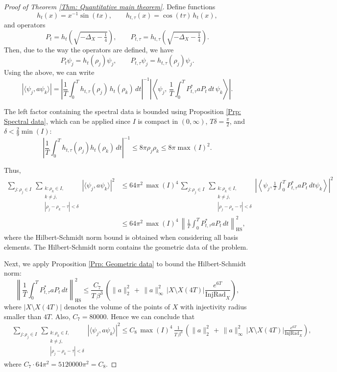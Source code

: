 \documentclass[11pt,twoside,reqno]{amsart} \usepackage{a4wide} \usepackage[T1]{fontenc} \usepackage[utf8]{inputenc} \usepackage{soul}  \usepackage{amsmath} \usepackage{amsfonts} \usepackage{amssymb} \usepackage{mathtools} \usepackage{amsthm} \usepackage{xcolor} \usepackage{graphicx} \usepackage{hyperref} \usepackage{standalone} \usepackage{esint} \usepackage{comment} \usepackage[left=2.3cm,top=3cm,right=2.3cm]{geometry} \usepackage{bm} \usepackage{svg} \usepackage{float} \numberwithin{equation}{section} \theoremstyle{plain} \newtheorem{thm}{Theorem}[section] \newtheorem{theorem}[thm]{Theorem} \newtheorem*{theorem*}{Theorem}\newtheorem{conj}[thm]{Conjecture} \newtheorem{lemma}[thm]{Lemma} \newtheorem{prop}[thm]{Proposition} \newtheorem{proposition}[thm]{Proposition} \newtheorem{cor}[thm]{Corollary} \newtheorem{question}[thm]{Question} \newtheorem{corollary}[thm]{Corollary} \newtheorem{assumption}[thm]{Assumption} \theoremstyle{definition} \newtheorem{defn}[thm]{Definition} \newtheorem{choice}[thm]{Choice} \newtheorem{definition}[thm]{Definition} \newtheorem{ex}[thm]{Example} \newtheorem{notation}[thm]{Notation} \newtheorem*{ack}{Acknowledgements} \theoremstyle{remark} \newtheorem{remark}[thm]{Remark} \newtheorem{bigremark}[thm]{Remark} \usepackage{xcolor} \newcommand{\red}[1]{ {\color{Red}#1} } \newcommand{\blue}[1]{ {\color{Blue}#1} } \author{Kai Hippi} \address{Aalto University, Espoo, Finland} \email{kai.hippi@aalto.fi}
\begin{document}
\begin{proof}[Proof of Theorem \ref{Thm: Quantitative main theorem}]
Define functions
\[
h_t(x) = x^{-1}\sin(tx),
\qquad
h_{t,\tau}(x) = \cos(t\tau)\, h_t(x),
\]
and operators
\[
P_t = h_t\left(\sqrt{-\Delta_X - \tfrac14}\right),
\qquad
P_{t,\tau} = h_{t,\tau}\left(\sqrt{-\Delta_X - \tfrac14}\right).
\]
Then, due to the way the operators are defined, we have
$$P_t \psi_j = h_t(\rho_j)\psi_j, \qquad P_{t,\tau}\psi_j = h_{t,\tau}(\rho_j)\psi_j.$$
Using the above, we can write
\[
|\langle \psi_j, a\psi_k \rangle|
=
\left|
\frac{1}{T}\int_0^T h_{t,\tau}(\rho_j)\, h_t(\rho_k)\, dt
\right|^{-1}
\left|
\left\langle \psi_j,\,
\frac{1}{T}\int_0^T P_{t,\tau}^* a P_t \, dt
\,\psi_k
\right\rangle
\right|.
\]

The left factor containing the spectral data is bounded using Proposition \ref{Prp: Spectral data}, which can be applied since $I$ is compact in $(0,\infty)$, $ T \delta = \tfrac{\pi}{2} $, and $\delta < \tfrac{2}{9} \min(I)$:
\[
\left|
\frac{1}{T}\int_0^T h_{t,\tau}(\rho_j) h_t(\rho_k)\, dt
\right|^{-1} \leq 8 \pi \rho_{j} \rho_{k}  \leq  8 \pi \max( I )^{2}.
\]

Thus,
\begin{align*}
\sum_{j:\rho_j \in I} 
\ \sum_{\substack{ k: \rho_{k} \in I, \\ k \neq j , \\ |\rho_j - \rho_k - \tau|<\delta}}
|\langle\psi_j,a\psi_k\rangle|^2
& \leq
64 \pi^{2} \, \max(I)^4 \, \sum_{j:\rho_j \in I} 
\ \sum_{\substack{ k: \rho_{k} \in I, \\ k \neq j , \\ |\rho_j - \rho_k - \tau|<\delta}}
\left| \left\langle\psi_j, \frac{1}{T} \int_{0}^{T} P_{t,\tau}^{*}a P_{t} \, dt \psi_k \right\rangle \right|^2
\\
& \leq
64 \pi^{2} \, \max( I )^{4} \, \left\|
\frac{1}{T}\int_0^T P_{t,\tau}^* a P_t\, dt
\right\|_{\mathrm{HS}}^2,
\end{align*}
where the Hilbert-Schmidt norm bound is obtained when considering all basis elements. The Hilbert-Schmidt norm contains the geometric data of the problem.

Next, we apply Proposition \ref{Prp: Geometric data} to bound the Hilbert-Schmidt norm:
$$
\left\|
\frac{1}{T}\int_0^T P_{t,\tau}^* a P_t\, dt
\right\|_{\mathrm{HS}}^2
\leq
\frac{C_{7}}{T \, \beta^{3}} \, \left( \| a \|_{2}^{2} \, + \, \| a \|_{\infty}^{2} \, | X \setminus X( 4T ) | \frac{e^{6 T}}{ \operatorname{InjRad}_{X} } \right),
$$
where $ | X \setminus X( 4T ) | $ denotes the volume of the points of $ X $ with injectivity radius smaller than $ 4T $. Also, $ C_{7} = 80000$. Hence we can conclude that
\begin{align*}
	&
	\sum_{j: \rho_j \in I}
\ \sum_{\substack{ k: \rho_{k} \in I, \\ k \neq j, \\ |\rho_j - \rho_k - \tau| < \delta}}
\left| \langle \psi_j, a \psi_k \rangle \right|^2 \leq C_{8} \, \max( I )^{4} \, \frac{1}{T \, \beta^{3}} \, \left( \| a \|_{2}^{2} \, + \,  \| a \|_{\infty}^{2} \, | X \setminus X( 4T ) | \frac{e^{6 T}}{ \operatorname{InjRad}_{X} } \right),
\end{align*}
where $C_{7} \cdot 64 \pi^{2} = 5 120 000 \pi^{2} = C_{8}$.


\end{proof}
\end{document}
